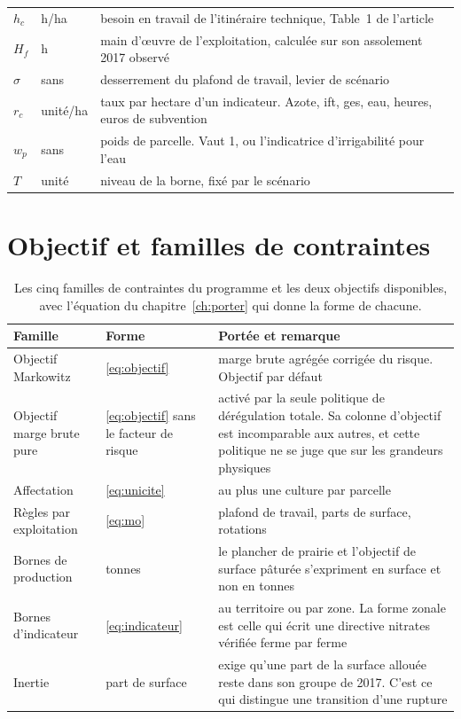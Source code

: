 \begin{table}[H]
\begin{tabularx}{\textwidth}{@{}llX@{}}
    $h_c$ & h/ha & besoin en travail de l'itinéraire technique, Table~1 de l'article \\
    $H_f$ & h & main d'\oe uvre de l'exploitation, calculée sur son assolement 2017 observé \\
    $\sigma$ & sans & desserrement du plafond de travail, levier de scénario \\
    $r_c$ & unité/ha & taux par hectare d'un indicateur. Azote, \gls{ift}, \gls{ges}, eau,
      heures, euros de subvention \\
    $w_p$ & sans & poids de parcelle. Vaut 1, ou l'indicatrice d'irrigabilité pour l'eau \\
    $T$ & unité & niveau de la borne, fixé par le scénario \\
    \bottomrule
  \end{tabularx}
\end{table}

\section{Objectif et familles de contraintes}

\begin{table}[H]
  \centering
  \caption{Les cinq familles de contraintes du programme et les deux objectifs disponibles,
  avec l'équation du chapitre~\ref{ch:porter} qui donne la forme de chacune.}
  \label{tab:ann-familles}
  \scriptsize
  \setlength{\tabcolsep}{4pt}
  \begin{tabularx}{\textwidth}{@{}>{\raggedright\arraybackslash}p{30mm}
                               >{\raggedright\arraybackslash}p{20mm}X@{}}
    \toprule
    \textbf{Famille} & \textbf{Forme} & \textbf{Portée et remarque} \\
    \midrule
    Objectif Markowitz & \eqref{eq:objectif} & marge brute agrégée corrigée du risque. Objectif
      par défaut \\
    Objectif marge brute pure & \eqref{eq:objectif} sans le facteur de risque &
      activé par la seule politique de dérégulation totale. Sa colonne d'objectif est
      incomparable aux autres, et cette politique ne se juge que sur les grandeurs physiques \\
    \midrule
    Affectation & \eqref{eq:unicite} & au plus une culture par parcelle \\
    Règles par exploitation & \eqref{eq:mo} & plafond de travail, parts de surface, rotations \\
    Bornes de production & tonnes & le plancher de prairie et l'objectif de surface pâturée
      s'expriment en surface et non en tonnes \\
    Bornes d'indicateur & \eqref{eq:indicateur} & au territoire ou par zone. La forme zonale
      est celle qui écrit une directive nitrates vérifiée ferme par ferme \\
    Inertie & part de surface & exige qu'une part de la surface allouée reste dans son groupe
      de 2017. C'est ce qui distingue une transition d'une rupture \\
    \bottomrule
  \end{tabularx}
\end{table}

